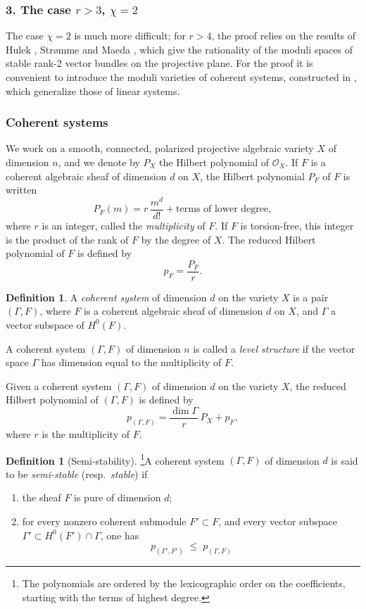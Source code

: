 \documentclass[12pt,english]{smfart}%
\theoremstyle{plain}
\theoremstyle{definition}
\newtheorem{definition}[theorem]{Definition}
\theoremstyle{remark}
\newcommand{\Oo}{\mathcal{O}}
\begin{document}
\subsubsection*{3. The case $r>3$, $\chi=2$}

The case $\chi=2$ is much more difficult; for $r>4$, the proof relies on the results of Hulek \cite{Hul}, Str\o mme \cite{Str} and Maeda \cite{Mae}, which give the rationality of the moduli spaces of stable rank-2 vector bundles on the projective plane. For the proof it is convenient to introduce the moduli varieties of coherent systems, constructed in \cite{LeP3}, which generalize those of linear systems.

\subsubsection*{Coherent systems}

We work on a smooth, connected, polarized projective algebraic variety $X$ of dimension $n$, and we denote by $P_X$ the Hilbert polynomial of $\Oo_X$. If $F$ is a coherent algebraic sheaf of dimension $d$ on $X$, the Hilbert polynomial $P_F$ of $F$ is written
\[
P_F(m) = r\,\frac{m^d}{d!} + \text{terms of lower degree},
\]
where $r$ is an integer, called the \emph{multiplicity} of $F$. If $F$ is torsion-free, this integer is the product of the rank of $F$ by the degree of $X$. The reduced Hilbert polynomial of $F$ is defined by
\[
p_F = \frac{P_F}{r}.
\]

\begin{definition}\label{def:coherent-system}
A \emph{coherent system} of dimension $d$ on the variety $X$ is a pair $(\Gamma,F)$, where $F$ is a coherent algebraic sheaf of dimension $d$ on $X$, and $\Gamma$ a vector subspace of $H^0(F)$.

A coherent system $(\Gamma,F)$ of dimension $n$ is called a \emph{level structure} if the vector space $\Gamma$ has dimension equal to the multiplicity of $F$.

Given a coherent system $(\Gamma,F)$ of dimension $d$ on the variety $X$, the reduced Hilbert polynomial of $(\Gamma,F)$ is defined by
\[
p_{(\Gamma,F)} = \frac{\dim\Gamma}{r}\,P_X + p_F,
\]
where $r$ is the multiplicity of $F$.
\end{definition}

\begin{definition}[Semi-stability]\footnote{The polynomials are ordered by the lexicographic order on the coefficients, starting with the terms of highest degree.}\label{def:cs-semistable} A coherent system $(\Gamma,F)$ of dimension $d$ is said to be \emph{semi-stable} (resp.\ \emph{stable}) if
\begin{enumerate}
\item[a)] the sheaf $F$ is pure of dimension $d$;
\item[b)] for every nonzero coherent submodule $F'\subset F$, and every vector subspace $\Gamma'\subset H^0(F')\cap\Gamma$, one has
\[
p_{(\Gamma',F')}\;\le\; p_{(\Gamma,F)}
\]
\end{enumerate}
\end{definition}
\end{document}
